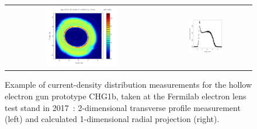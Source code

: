 \documentclass[aps
,prstab
,reprint
,longbibliography
,preprintnumbers
,showkeys
,amsfonts,amssymb,amsmath
,floatfix
]{revtex4-1}
\begin{document}
\begin{figure}
  \begin{tabular}{cc}
    \includegraphics[width=0.48\textwidth]{CHG1b_170523_8p75A_2-4-2kG_500V_75mA_hires_2D} &
    \includegraphics[width=0.4\textwidth]{CHG1b_170523_8p75A_2-4-2kG_500V_75mA_hires_j-vs-r_binned_nogrid_nolabel}\\
  \end{tabular}
  \caption{Example of current-density distribution measurements for
    the hollow electron gun prototype CHG1b, taken at the Fermilab
    electron lens test stand in
    2017~\cite{hel_res_field_stancari_2017}: 2-dimensional transverse
    profile measurement (left) and calculated 1-dimensional radial
    projection (right).}
  \label{core:fig:0}
\end{figure}
\end{document}
